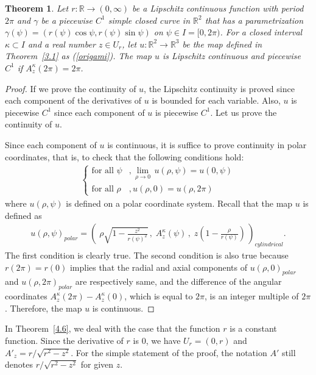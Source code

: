 \documentclass{amsart}
\theoremstyle{plain}
\newtheorem{theorem}{Theorem}[section]
\theoremstyle{definition}
\theoremstyle{remark}
\begin{document}
\begin{theorem}\label{4.5} %
Let $r \colon \mathbb{R}\to(0,\infty)$ be a Lipschitz continuous function with period $2\pi$ and $\gamma$ be a piecewise $C^1$ simple closed curve in $\mathbb{R}^2$ that has a parametrization $\gamma(\psi)=(r(\psi)\cos\psi,r(\psi)\sin\psi)$ on $\psi\in I=[0,2\pi)$. 
For a closed interval $\kappa\subset I$ and a real number $z\in U_r$, let $u \colon \mathbb{R}^2\to\mathbb{R}^3$ be the map defined in Theorem~\ref{3.1} as (\ref{origami}).
The map $u$ is Lipschitz continuous and piecewise $C^1$ if $A_z^{\kappa}(2\pi)=2\pi$.
\end{theorem}

\begin{proof}
If we prove the continuity of $u$, the Lipschitz continuity is proved since each component of the derivatives of $u$ is bounded for each variable.
Also, $u$ is piecewise $C^1$ since each component of $u$ is piecewise $C^1$.
Let us prove the continuity of $u$.

Since each component of $u$ is continuous, it is suffice to prove continuity in polar coordinates, 
that is, to check that the following conditions hold:
\begin{align*}
\begin{cases}
\text{for all $\psi$}&,\displaystyle{\lim_{\rho\to0}}\,u(\rho,\psi)=u(0,\psi) \\
\text{for all $\rho$}&,u(\rho,0)=u(\rho,2\pi)
\end{cases}
\end{align*}
where $u(\rho,\psi)$ is defined on a polar coordinate system.
Recall that the map $u$ is defined as
\begin{align*}
u(\rho,\psi)_{polar}=\left(\;\rho\sqrt{1-\frac{z^2}{r(\psi)^2}}\,,
\;A_z^{\kappa}(\psi)\,,
\;z\left(1-\frac{\rho}{r(\psi)}\right)\,\right)_{cylindrical}.
\end{align*}
The first condition is clearly true.
The second condition is also true because $r(2\pi)=r(0)$ implies that the radial and axial components of $u(\rho,0)_{polar}$ and $u(\rho,2\pi)_{polar}$ are respectively same, and the difference of the angular coordinates $A_z^{\kappa}(2\pi)-A_z^{\kappa}(0)$, which is equal to $2\pi$, is an integer multiple of $2\pi$.
Therefore, the map $u$ is continuous.
\end{proof}




In Theorem~\ref{4.6}, we deal with the case that the function $r$ is a constant function.
Since the derivative of $r$ is $0$, we have $U_r=(0,r)$ and $A'_z=r/\sqrt{r^2-z^2}$.
For the simple statement of the proof, the notation $A'$ still denotes $r/\sqrt{r^2-z^2}$ for given $z$.
\end{document}
